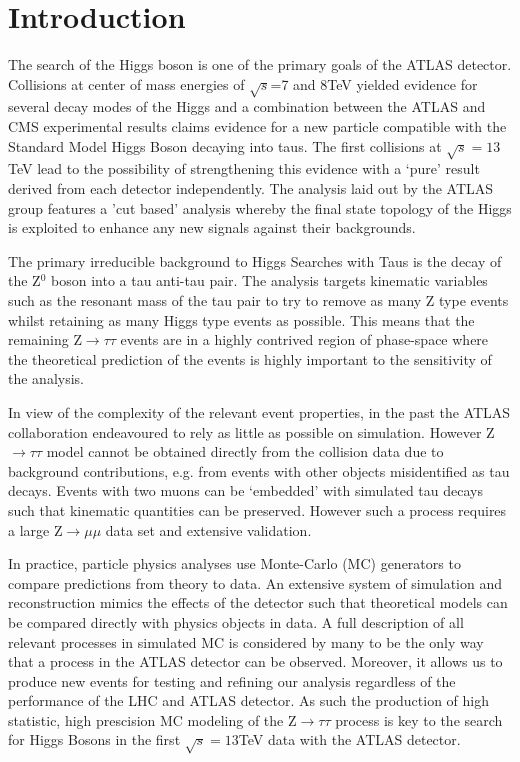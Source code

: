 \section{Introduction}
\label{sec:intro}

The search of the Higgs boson is one of the primary goals of the ATLAS detector. Collisions at center of mass energies of $\sqrt{s}$=7 and 8TeV yielded evidence for several decay modes of the Higgs and a combination between the ATLAS and CMS experimental results claims evidence for a new particle compatible with the Standard Model Higgs Boson decaying into taus. The first collisions at $\sqrt{s}=13$TeV lead to the possibility of strengthening this evidence with a `pure' result derived from each detector independently. The analysis laid out by the ATLAS group features a 'cut based' analysis whereby the final state topology of the Higgs is exploited to enhance any new signals against their backgrounds. 

The primary irreducible background to Higgs Searches with Taus is the decay of the Z$^0$ boson into a tau anti-tau pair. The analysis targets kinematic variables such as the resonant mass of the tau pair to try to remove as many Z type events whilst retaining as many Higgs type events as possible. This means that the remaining Z$\rightarrow\tau\tau$ events are in a highly contrived region of phase-space where the theoretical prediction of the events is highly important to the sensitivity of the analysis. 

In view of the complexity of the
relevant event properties, in the past the ATLAS collaboration endeavoured to rely as little as possible on simulation. However Z$\rightarrow\tau\tau$ model cannot be obtained directly from the collision data due to background contributions, e.g.  from events with other objects misidentified as tau decays. Events with two muons can be `embedded' with simulated tau decays such that kinematic quantities can be preserved. However such a process requires a large Z$\rightarrow\mu\mu$ data set and extensive validation.

In practice, particle physics analyses use Monte-Carlo (MC) generators to compare predictions from theory to data. An extensive system of simulation and reconstruction mimics the effects of the detector such that theoretical models can be compared directly with physics objects in data. A full description of all relevant processes in simulated MC is considered by many to be the only way that a process in the ATLAS detector can be observed. Moreover, it allows us to produce new events for testing and refining our analysis regardless of the performance of the LHC and ATLAS detector. As such the production of high statistic, high prescision MC modeling of the Z$\rightarrow\tau\tau$ process is key to the search for Higgs Bosons in the first $\sqrt{s}=13$TeV data with the ATLAS detector.

